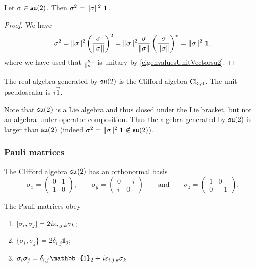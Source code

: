 \begin{proposition}
Let $\sigma\in\operatorname{\mathfrak{su}}(2)$. Then $\sigma^2 = \lVert\sigma\rVert^2\;\boldsymbol{\mathrm{1}}$.
\end{proposition}
\begin{proof}
We have 
\[ \sigma^2 = \lVert\sigma\rVert^2 \left(\frac{\sigma}{\lVert\sigma\rVert}\right)^2 = \lVert\sigma\rVert^2 \frac{\sigma}{\lVert\sigma\rVert}\left(\frac{\sigma}{\lVert\sigma\rVert}\right)^* = \lVert\sigma\rVert^2\;\boldsymbol{\mathrm{1}}, \]
where we have used that $\frac{\sigma}{\lVert\sigma\rVert}$ is unitary by \ref{eigenvaluesUnitVectorsu2}.
\end{proof}
\begin{corollary}
The real algebra generated by $\operatorname{\mathfrak{su}}(2)$ is the Clifford algebra $\operatorname{Cl}_{3,0}$. The unit pseudoscalar is $i\vec{1}$.
\end{corollary}
Note that $\operatorname{\mathfrak{su}}(2)$ is a Lie algebra and thus closed under the Lie bracket, but not an algebra under operator composition. Thus the algebra generated by $\operatorname{\mathfrak{su}}(2)$ is larger than $\operatorname{\mathfrak{su}}(2)$ (indeed $\sigma^2 = \lVert\sigma\rVert^2\;\boldsymbol{\mathrm{1}}\notin \operatorname{\mathfrak{su}}(2)$).

\subsubsection{Pauli matrices}
\begin{proposition}
The Clifford algebra $\operatorname{\mathfrak{su}}(2)$ has an orthonormal basis
\[ \sigma_x = \begin{pmatrix}
0 & 1 \\ 1 & 0
\end{pmatrix}, \qquad \sigma_y = \begin{pmatrix}
0 & -i \\ i & 0
\end{pmatrix} \qquad \text{and}\qquad \sigma_z = \begin{pmatrix}
1 & 0 \\ 0 & -1
\end{pmatrix}. \]
\end{proposition}

\begin{proposition}
The Pauli matrices obey
\begin{enumerate}
\item $[\sigma_i, \sigma_j] = 2i\varepsilon_{i,j,k}\sigma_k$;
\item $\{\sigma_i, \sigma_j\} = 2\delta_{i,j}\mathbb{1}_2$;
\item $\sigma_i\sigma_j = \delta_{i,j}\mathbb{1}_2 + i\leviCivita_{i,j,k}\sigma_{k}$
\end{enumerate}
\end{proposition}

